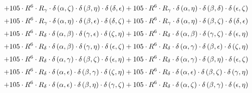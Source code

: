 \begin{subequations}
\begin{gather}
 \\[0.2em] \notag 		 + 105 \cdot R^{6} \cdot R_{\gamma{}} \cdot \delta{}\left(\alpha{}, \zeta{}\right) \cdot \delta{}\left(\beta{}, \eta{}\right) \cdot \delta{}\left(\delta{}, \epsilon{}\right)+ 105 \cdot R^{6} \cdot R_{\gamma{}} \cdot \delta{}\left(\alpha{}, \eta{}\right) \cdot \delta{}\left(\beta{}, \delta{}\right) \cdot \delta{}\left(\epsilon{}, \zeta{}\right) 
 \\[0.2em] \notag 		 + 105 \cdot R^{6} \cdot R_{\gamma{}} \cdot \delta{}\left(\alpha{}, \eta{}\right) \cdot \delta{}\left(\beta{}, \epsilon{}\right) \cdot \delta{}\left(\delta{}, \zeta{}\right)+ 105 \cdot R^{6} \cdot R_{\gamma{}} \cdot \delta{}\left(\alpha{}, \eta{}\right) \cdot \delta{}\left(\beta{}, \zeta{}\right) \cdot \delta{}\left(\delta{}, \epsilon{}\right) 
 \\[0.2em] \notag 		 + 105 \cdot R^{6} \cdot R_{\delta{}} \cdot \delta{}\left(\alpha{}, \beta{}\right) \cdot \delta{}\left(\gamma{}, \epsilon{}\right) \cdot \delta{}\left(\zeta{}, \eta{}\right)+ 105 \cdot R^{6} \cdot R_{\delta{}} \cdot \delta{}\left(\alpha{}, \beta{}\right) \cdot \delta{}\left(\gamma{}, \zeta{}\right) \cdot \delta{}\left(\epsilon{}, \eta{}\right) 
 \\[0.2em] \notag 		 + 105 \cdot R^{6} \cdot R_{\delta{}} \cdot \delta{}\left(\alpha{}, \beta{}\right) \cdot \delta{}\left(\gamma{}, \eta{}\right) \cdot \delta{}\left(\epsilon{}, \zeta{}\right)+ 105 \cdot R^{6} \cdot R_{\delta{}} \cdot \delta{}\left(\alpha{}, \gamma{}\right) \cdot \delta{}\left(\beta{}, \epsilon{}\right) \cdot \delta{}\left(\zeta{}, \eta{}\right) 
 \\[0.2em] \notag 		 + 105 \cdot R^{6} \cdot R_{\delta{}} \cdot \delta{}\left(\alpha{}, \gamma{}\right) \cdot \delta{}\left(\beta{}, \zeta{}\right) \cdot \delta{}\left(\epsilon{}, \eta{}\right)+ 105 \cdot R^{6} \cdot R_{\delta{}} \cdot \delta{}\left(\alpha{}, \gamma{}\right) \cdot \delta{}\left(\beta{}, \eta{}\right) \cdot \delta{}\left(\epsilon{}, \zeta{}\right) 
 \\[0.2em] \notag 		 + 105 \cdot R^{6} \cdot R_{\delta{}} \cdot \delta{}\left(\alpha{}, \epsilon{}\right) \cdot \delta{}\left(\beta{}, \gamma{}\right) \cdot \delta{}\left(\zeta{}, \eta{}\right)+ 105 \cdot R^{6} \cdot R_{\delta{}} \cdot \delta{}\left(\alpha{}, \epsilon{}\right) \cdot \delta{}\left(\beta{}, \zeta{}\right) \cdot \delta{}\left(\gamma{}, \eta{}\right) 
 \\[0.2em] \notag 		 + 105 \cdot R^{6} \cdot R_{\delta{}} \cdot \delta{}\left(\alpha{}, \epsilon{}\right) \cdot \delta{}\left(\beta{}, \eta{}\right) \cdot \delta{}\left(\gamma{}, \zeta{}\right)+ 105 \cdot R^{6} \cdot R_{\delta{}} \cdot \delta{}\left(\alpha{}, \zeta{}\right) \cdot \delta{}\left(\beta{}, \gamma{}\right) \cdot \delta{}\left(\epsilon{}, \eta{}\right) 

\end{gather}
\end{subequations}
